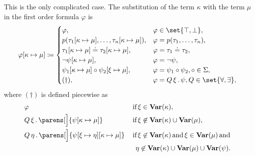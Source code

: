 \begin{definition}
\begin{thmenum}
     This is the only complicated case. The substitution of the term \( \kappa \) with the term \( \mu \) in the first order formula \( \varphi \) is
    \begin{equation}\label{eq:def:first_order_substitution/term_in_formula}
      \varphi[\kappa \mapsto \mu] \coloneqq \begin{cases}
        \varphi,                                                           &\varphi \in \set{ \top, \bot }, \\
        p(\tau_1[\kappa \mapsto \mu], \ldots, \tau_n[\kappa \mapsto \mu]), &\varphi = p(\tau_1, \ldots, \tau_n), \\
        \tau_1[\kappa \mapsto \mu] \doteq \tau_2[\kappa \mapsto \mu],      &\varphi = \tau_1 \doteq \tau_2, \\
        \neg \psi[\kappa \mapsto \mu],                                     &\varphi = \neg \psi, \\
        \psi_1[\kappa \mapsto \mu] \circ \psi_2[\xi \mapsto \mu],          &\varphi = \psi_1 \circ \psi_2, \circ \in \Sigma, \\
        (\dagger),                                                         &\varphi = \quantifier{Q}{\xi} \psi, Q \in \set{ \forall, \exists },
      \end{cases}
    \end{equation}
    where \( (\dagger) \) is defined piecewise as
    \begin{align}
      &\varphi                                                                    &&\T{if} \xi \in \boldop{Var}(\kappa), \label{eq:def:first_order_substitution/term_in_formula/quantifiers/trivial} \\
      &\quantifier{Q}{\xi} \parens[\Big]{\psi[\kappa \mapsto \mu]}                    &&\T{if} \xi \not\in \boldop{Var}(\kappa) \cup \boldop{Var}(\mu), \label{eq:def:first_order_substitution/term_in_formula/quantifiers/direct} \\
      &\quantifier{Q}{\eta} \parens[\Big]{\psi[\xi \mapsto \eta][\kappa \mapsto \mu]} &&\T{if} \xi \not\in \boldop{Var}(\kappa) \T{and} \xi \in \boldop{Var}(\mu) \T{and} \label{eq:def:first_order_substitution/term_in_formula/quantifiers/renaming} \\
                                                                                  &&&\phantom{\T{if}} \eta \not\in \boldop{Var}(\kappa) \cup \boldop{Var}(\mu) \cup \boldop{Var}(\psi). \nonumber
    \end{align}


\end{thmenum}
\end{definition}
